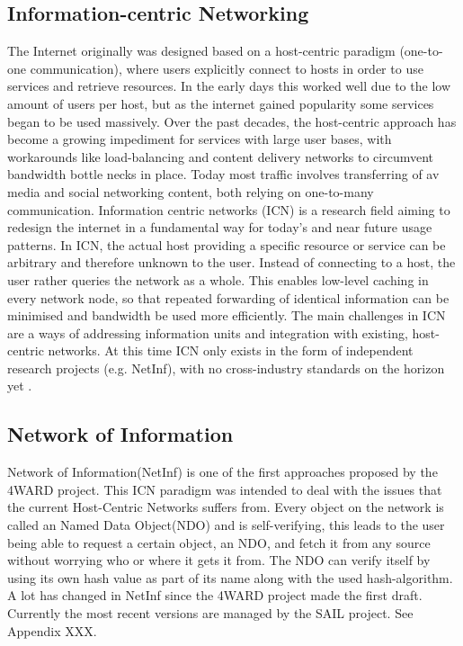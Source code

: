 \subsection{Information-centric Networking}
\label{sec:netinf}
The Internet originally was designed based on a host-centric paradigm (one-to-one communication), where users explicitly connect to hosts in order to use services and retrieve resources. In the early days this worked well due to the low amount of users per host, but as the internet gained popularity some services began to be used massively. Over the past decades, the host-centric approach has become a growing impediment for services with large user bases, with workarounds like load-balancing and content delivery networks to circumvent bandwidth bottle necks in place. Today most traffic involves transferring of av media and social networking content, both relying on one-to-many communication. Information centric networks (ICN) is a research field aiming to redesign the internet in a fundamental way for today's and near future usage patterns. In ICN, the actual host providing a specific resource or service can be arbitrary and therefore unknown to the user. Instead of connecting to a host, the user rather queries the network as a whole. This enables low-level caching in every network node, so that repeated forwarding of identical information can be minimised and bandwidth be used more efficiently. The main challenges in ICN are a ways of addressing information units and integration with existing, host-centric networks. At this time ICN only exists in the form of independent research projects (e.g. NetInf), with no cross-industry standards on the horizon yet \cite{ICNarticle}. 


\subsection{Network of Information}
Network of Information(NetInf) is one of the first approaches proposed by the 4WARD project. \cite{4ward} This ICN paradigm was intended to deal with the issues that the current Host-Centric Networks suffers from. Every object on the network is called an Named Data Object(NDO) and is self-verifying, this leads to the user being able to request a certain object, an NDO, and fetch it from any source without worrying who or where it gets it from. The NDO can verify itself by using its own hash value as part of its name along with the used hash-algorithm.
A lot has changed in NetInf since the 4WARD project made the first draft. Currently the most recent versions are managed by the SAIL project. See Appendix XXX.

